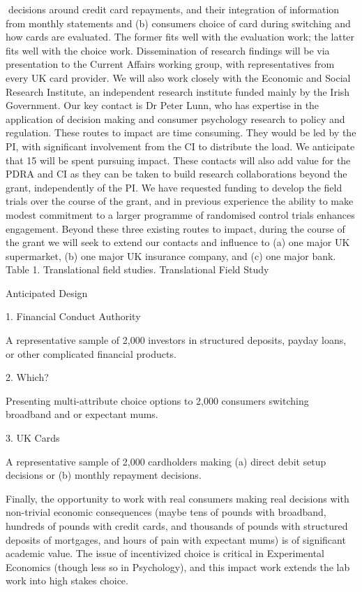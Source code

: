 \documentclass[11pt, a4paper]{article}
\begin{document}
decisions around credit card repayments, and their integration of information from monthly
statements and (b) consumers choice of card during switching and how cards are evaluated.
The former fits well with the evaluation work; the latter fits well with the choice work.
Dissemination of research findings will be via presentation to the Current Affairs working
group, with representatives from every UK card provider.
We will also work closely with the Economic and Social Research Institute, an independent
research institute funded mainly by the Irish Government. Our key contact is Dr Peter Lunn,
who has expertise in the application of decision making and consumer psychology research to
policy and regulation.
These routes to impact are time consuming. They would be led by the PI, with significant
involvement from the CI to distribute the load. We anticipate that 15%
will be spent pursuing impact. These contacts will also add value for the PDRA and CI as
they can be taken to build research collaborations beyond the grant, independently of the PI.
We have requested funding to develop the field trials over the course of the grant, and in
previous experience the ability to make modest commitment to a larger programme of
randomised control trials enhances engagement.
Beyond these three existing routes to impact, during the course of the grant we will seek to
extend our contacts and influence to (a) one major UK supermarket, (b) one major UK
insurance company, and (c) one major bank.
Table 1. Translational field studies.
Translational Field Study

Anticipated Design

1. Financial Conduct
Authority

A representative sample of 2,000 investors in structured
deposits, payday loans, or other complicated financial
products.

2. Which?

Presenting multi-attribute choice options to 2,000
consumers switching broadband and or expectant mums.

3. UK Cards

A representative sample of 2,000 cardholders making (a)
direct debit setup decisions or (b) monthly repayment
decisions.

Finally, the opportunity to work with real consumers making real decisions with non-trivial
economic consequences (maybe tens of pounds with broadband, hundreds of pounds with
credit cards, and thousands of pounds with structured deposits of mortgages, and hours of
pain with expectant mums) is of significant academic value. The issue of incentivized choice
is critical in Experimental Economics (though less so in Psychology), and this impact work
extends the lab work into high stakes choice.
\end{document}
